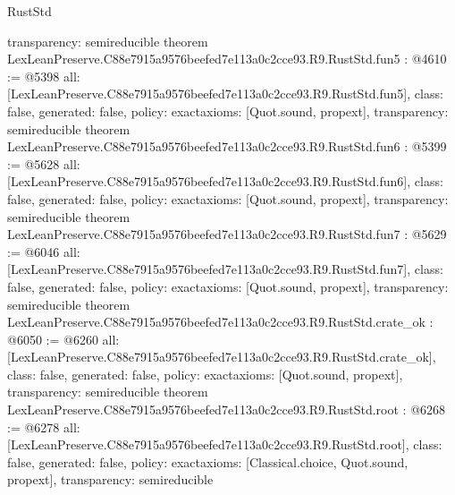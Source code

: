 \begin{lexlean}{RustStd}
\begin{coremodule}
{  transparency: semireducible
}
theorem LexLeanPreserve.C88e7915a9576beefed7e113a0c2cce93.R9.RustStd.fun5 : @4610 := @5398 {
  all: [LexLeanPreserve.C88e7915a9576beefed7e113a0c2cce93.R9.RustStd.fun5],
  class: false,
  generated: false,
  policy: exact{axioms: [Quot.sound, propext]},
  transparency: semireducible
}
theorem LexLeanPreserve.C88e7915a9576beefed7e113a0c2cce93.R9.RustStd.fun6 : @5399 := @5628 {
  all: [LexLeanPreserve.C88e7915a9576beefed7e113a0c2cce93.R9.RustStd.fun6],
  class: false,
  generated: false,
  policy: exact{axioms: [Quot.sound, propext]},
  transparency: semireducible
}
theorem LexLeanPreserve.C88e7915a9576beefed7e113a0c2cce93.R9.RustStd.fun7 : @5629 := @6046 {
  all: [LexLeanPreserve.C88e7915a9576beefed7e113a0c2cce93.R9.RustStd.fun7],
  class: false,
  generated: false,
  policy: exact{axioms: [Quot.sound, propext]},
  transparency: semireducible
}
theorem LexLeanPreserve.C88e7915a9576beefed7e113a0c2cce93.R9.RustStd.crate_ok : @6050 := @6260 {
  all: [LexLeanPreserve.C88e7915a9576beefed7e113a0c2cce93.R9.RustStd.crate_ok],
  class: false,
  generated: false,
  policy: exact{axioms: [Quot.sound, propext]},
  transparency: semireducible
}
theorem LexLeanPreserve.C88e7915a9576beefed7e113a0c2cce93.R9.RustStd.root : @6268 := @6278 {
  all: [LexLeanPreserve.C88e7915a9576beefed7e113a0c2cce93.R9.RustStd.root],
  class: false,
  generated: false,
  policy: exact{axioms: [Classical.choice, Quot.sound, propext]},
  transparency: semireducible
}


\end{coremodule}
\end{lexlean}
